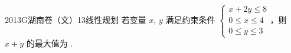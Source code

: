 
\begin{problem}{2013}{G}{湖南卷（文）}{13}{线性规划}
若变量 $ x $, $ y $ 满足约束条件 $
\begin{cases}
x+2y\leq 8\\
0\leq x\leq 4\\
0\leq y\leq 3
\end{cases}
$，则 $ x+y $ 的最大值为 \underline{\hspace{4em}}.
\end{problem}

\begin{answer}

\end{answer}

\begin{solutions}

\end{solutions}